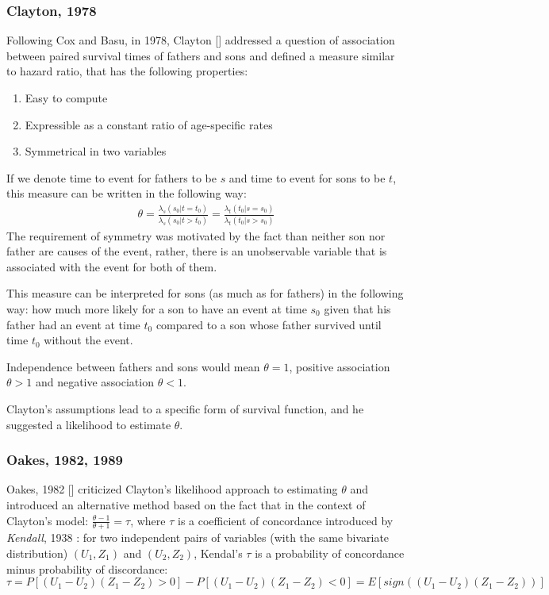 \documentclass[]{article}
\begin{document}
\subsubsection{Clayton, 1978}
Following Cox and Basu, in 1978, Clayton [\cite{clayton1978model}] addressed a question of association between paired survival times of fathers and sons and defined a measure similar to hazard ratio, that has the following properties:
\begin{enumerate}
	\item Easy to compute
	\item Expressible as a constant ratio of age-specific rates
  \item Symmetrical in two variables
\end{enumerate}
If we denote time to event for fathers to be $s$ and time to event for sons to be $t$, this measure can be written in the following way:
$$
\begin{aligned}
	\theta = \frac{\lambda_s(s_0|t=t_0)}{\lambda_s(s_0|t>t_0)} = \frac{\lambda_t(t_0|s=s_0)}{\lambda_t(t_0|s>s_0)}
\end{aligned}
$$
The requirement of symmetry was motivated by the fact than neither son nor father are causes of the event, rather, there is an unobservable variable that is associated with the event for both of them.

This measure can be interpreted for sons (as much as for fathers) in the following way: how much more likely for a son to have an event at time $s_0$ given that his father had an event at time $t_0$ compared to a son whose father survived until time $t_0$ without the event.

Independence between fathers and sons would mean $\theta = 1$, positive association $\theta > 1$ and negative association $\theta < 1$. %

Clayton's assumptions lead to a specific form of survival function, and he suggested a likelihood to estimate $\theta$.

\subsubsection{Oakes, 1982, 1989}
Oakes, 1982 [\cite{oakes1982model}] criticized Clayton's likelihood approach to estimating $\theta$ and introduced an alternative method based on the fact that in the context of Clayton's model: $\frac{\theta - 1}{\theta + 1} = \tau$, where $\tau$ is a coefficient of concordance introduced by \emph{Kendall}, 1938 \cite{kendall1938new}: for two independent pairs of variables (with the same bivariate distribution) $(U_1, Z_1)$ and $(U_2, Z_2)$, Kendal's $\tau$ is a probability of concordance minus probability of discordance:
$\tau = P[(U_1 - U_2)(Z_1 - Z_2)>0] - P[(U_1 - U_2)(Z_1 - Z_2)<0] = E[sign((U_1 - U_2)(Z_1 - Z_2))]$\\
\end{document}
